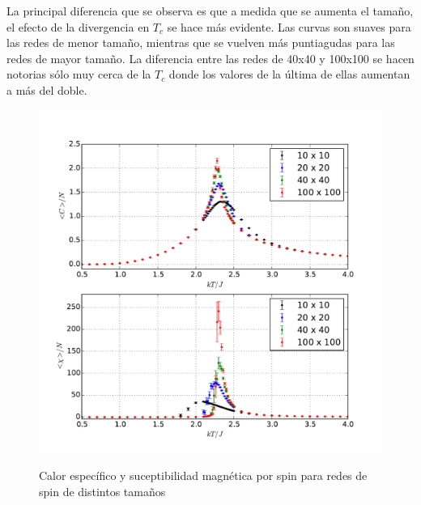 \documentclass[a4paper,12pt]{article}
\begin{document}
La principal diferencia que se observa es que a medida que se aumenta el 
tamaño, el efecto de la divergencia en $T_c$ se hace más evidente. Las curvas 
son suaves para las redes de menor tamaño, mientras que se vuelven más 
puntiagudas para las redes de mayor tamaño. La diferencia entre las redes de 
40x40 y 100x100 se hacen notorias sólo muy cerca de la $T_c$ donde los valores 
de la última de ellas aumentan a más del doble.

\begin{figure}[H]
    \begin{center}
      \includegraphics[scale=0.7]{tamano_fluctuaciones.pdf} \\
      \caption{Calor específico y suceptibilidad magnética por spin para redes 
      de spin 
      de distintos tamaños}\label{fig:tam_fluctuaciones}
    \end{center}
\end{figure}

\end{document}
